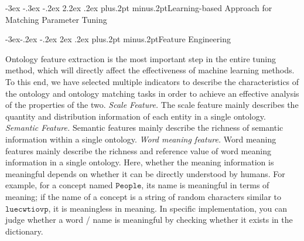 \documentclass[twoside]{article}
\makeatletter
\def\section{\@startsection{section}{1}{\z@}%
 {-3ex \@plus -.3ex \@minus -.2ex}%
 {2.2ex \@plus.2ex}%
{\normalfont\normalsize\protect\baselineskip=14.5pt plus.2pt minus.2pt\bfseries}}
\def\subsection{\@startsection{subsection}{2}{\z@}%
 {-3ex\@plus -.2ex \@minus -.2ex}%
 {2ex \@plus.2ex}%
{\normalfont\normalsize\protect\baselineskip=12.5pt plus.2pt minus.2pt\bfseries}}
\makeatother
\begin{document}
\noindent
{}


\section{Learning-based Approach for Matching Parameter Tuning}

\subsection{Feature Engineering}

Ontology feature extraction is the most important step in the entire tuning method, which will directly affect the effectiveness of machine learning methods. To this end, we have selected multiple indicators to describe the characteristics of the ontology and ontology matching tasks in order to achieve an effective analysis of the properties of the two.
{\it Scale Feature.} The scale feature mainly describes the quantity and distribution information of each entity in a single ontology.
{\it Semantic Feature.} Semantic features mainly describe the richness of semantic information within a single ontology.
{\it Word meaning feature.} Word meaning features mainly describe the richness and reference value of word meaning information in a single ontology.
Here, whether the meaning information is meaningful depends on whether it can be directly understood by humans.
For example, for a concept named $\texttt{People}$, its name is meaningful in terms of meaning; if the name of a concept is a string of random characters similar to $\texttt{luecwtiovp}$, it is meaningless in meaning.
In specific implementation, you can judge whether a word / name is meaningful by checking whether it exists in the dictionary.
\end{document}
